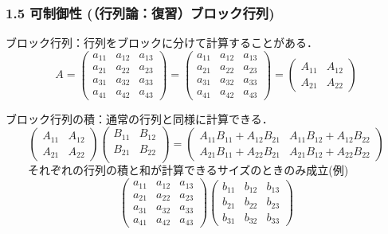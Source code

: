 \documentclass[10pt]{beamer}
\begin{document}
\begin{frame}[t]
\frametitle{1.5 可制御性 (（行列論：復習）ブロック行列)}
ブロック行列：行列をブロックに分けて計算することがある．
\begin{equation*}
	A =
	\left(\begin{array}{ccc}
			a_{11} & a_{12} & a_{13}\\
			a_{21} & a_{22} & a_{23}\\
			a_{31} & a_{32} & a_{33}\\
			a_{41} & a_{42} & a_{43}
	\end{array}\right)
	=
	\left(\begin{array}{c|cc}
			a_{11} & a_{12} & a_{13}\\
			a_{21} & a_{22} & a_{23}\\
			\hline
			a_{31} & a_{32} & a_{33}\\
			a_{41} & a_{42} & a_{43}
	\end{array}\right)
	=
	\left(\begin{array}{cc}
		A_{11} & A_{12} \\
		A_{21} & A_{22}
	\end{array}\right)
\end{equation*}

ブロック行列の積：通常の行列と同様に計算できる．
\begin{equation*}
	\left(\begin{array}{cc}
		A_{11} & A_{12} \\
		A_{21} & A_{22}
	\end{array}\right)
	\left(\begin{array}{cc}
		B_{11} & B_{12} \\
		B_{21} & B_{22} \\
	\end{array}\right)
	=
	\left(\begin{array}{cc}
		A_{11} B_{11} + A_{12} B_{21} & A_{11} B_{12} + A_{12} B_{22} \\
		A_{21} B_{11} + A_{22} B_{21} & A_{21} B_{12} + A_{22} B_{22}
	\end{array}\right)
\end{equation*}
　　それぞれの行列の積と和が計算できるサイズのときのみ成立(例)
\begin{equation*}
	\left(\begin{array}{c|cc}
			a_{11} & a_{12} & a_{13}\\
			a_{21} & a_{22} & a_{23}\\
			\hline
			a_{31} & a_{32} & a_{33}\\
			a_{41} & a_{42} & a_{43}
	\end{array}\right)
	\left(\begin{array}{cc|c}
			b_{11} & b_{12} & b_{13}\\
			\hline
			b_{21} & b_{22} & b_{23}\\
			b_{31} & b_{32} & b_{33}
	\end{array}\right)
\end{equation*}
\end{frame}
\end{document}
